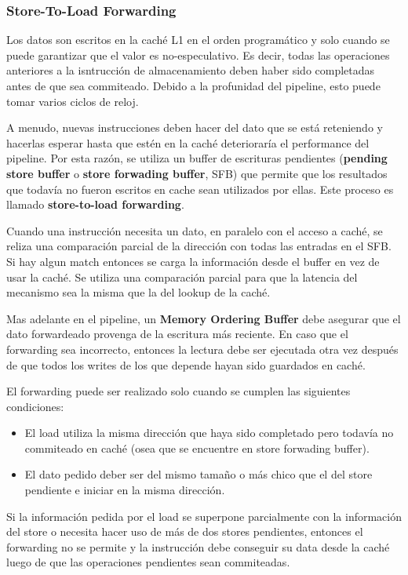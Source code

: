 \subsubsection*{Store-To-Load Forwarding}\label{sec::Intel::NetBurst::FrontEnd::Forwarding}
Los datos son escritos en la caché L1 en el orden programático y solo cuando se puede garantizar que el valor es no-especulativo. Es decir, todas las operaciones anteriores a la isntrucción de almacenamiento deben haber sido completadas antes de que sea commiteado. Debido a la profunidad del pipeline, esto puede tomar varios ciclos de reloj.

A menudo, nuevas instrucciones deben hacer del dato que se está reteniendo y hacerlas esperar hasta que estén en la caché deterioraría el performance del pipeline. Por esta razón, se utiliza un buffer de escrituras pendientes (\textbf{pending store buffer} o \textbf{store forwading buffer}, SFB) que permite que los resultados que todavía no fueron escritos en cache sean utilizados por ellas. Este proceso es llamado \textbf{store-to-load forwarding}.

Cuando una instrucción necesita un dato, en paralelo con el acceso a caché, se reliza una comparación parcial de la dirección con todas las entradas en el SFB. Si hay algun match entonces se carga la información desde el buffer en vez de usar la caché. Se utiliza una comparación parcial para que la latencia del mecanismo sea la misma que la del lookup de la caché.

Mas adelante en el pipeline, un \textbf{Memory Ordering Buffer} debe asegurar que el dato forwardeado provenga de la escritura más reciente. En caso que el forwarding sea incorrecto, entonces la lectura debe ser ejecutada otra vez después de que todos los writes de los que depende hayan sido guardados en caché.

El forwarding puede ser realizado solo cuando se cumplen las siguientes condiciones:
\begin{itemize}
	\item El load utiliza la misma dirección que haya sido completado pero todavía no commiteado en caché (osea que se encuentre en store forwading buffer).
	\item El dato pedido deber ser del mismo tamaño o más chico que el del store pendiente e iniciar en la misma dirección.
\end{itemize}

Si la información pedida por el load se superpone parcialmente con la información del store o necesita hacer uso de más de dos stores pendientes, entonces el forwarding no se permite y  la instrucción debe conseguir su data desde la caché luego de que las operaciones pendientes sean commiteadas.


